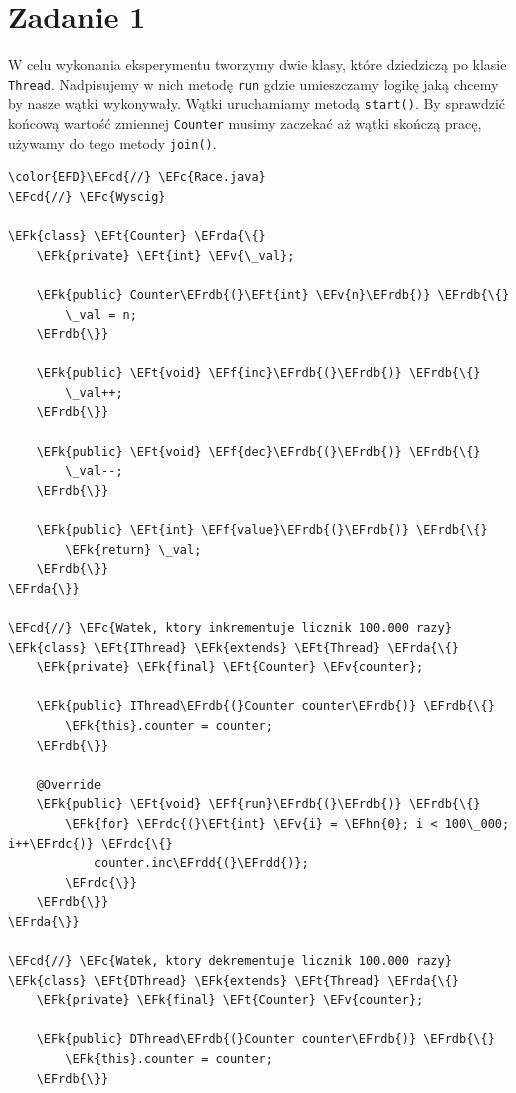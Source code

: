 \documentclass[11pt]{article}
\newcommand{\EFc}[1]{\textcolor{EFc}{#1}} %
\newcommand{\EFcd}[1]{\textcolor{EFcd}{#1}} %
\newcommand{\EFk}[1]{\textbf{#1}} %
\newcommand{\EFf}[1]{\textbf{#1}} %
\newcommand{\EFv}[1]{#1} %
\newcommand{\EFt}[1]{\textbf{#1}} %
\newcommand{\EFhn}[1]{\textcolor{EFhn}{\textbf{#1}}} %
\newcommand{\EFrda}[1]{\textcolor{EFrda}{#1}} %
\newcommand{\EFrdb}[1]{\textcolor{EFrdb}{#1}} %
\newcommand{\EFrdc}[1]{\textcolor{EFrdc}{#1}} %
\newcommand{\EFrdd}[1]{\textcolor{EFrdd}{#1}} %
\begin{document}
\section*{Zadanie 1}
\label{sec:orgdeca7f2}
W celu wykonania eksperymentu tworzymy dwie klasy, które dziedziczą po klasie
\texttt{Thread}. Nadpisujemy w nich metodę \texttt{run} gdzie umieszczamy logikę jaką chcemy by nasze
wątki wykonywały. Wątki uruchamiamy metodą \texttt{start()}. By sprawdzić końcową wartość
zmiennej \texttt{Counter} musimy zaczekać aż wątki skończą pracę, używamy do tego
metody \texttt{join()}.


\begin{Code}
\begin{Verbatim}
\color{EFD}\EFcd{//} \EFc{Race.java}
\EFcd{//} \EFc{Wyscig}

\EFk{class} \EFt{Counter} \EFrda{\{}
    \EFk{private} \EFt{int} \EFv{\_val};

    \EFk{public} Counter\EFrdb{(}\EFt{int} \EFv{n}\EFrdb{)} \EFrdb{\{}
        \_val = n;
    \EFrdb{\}}

    \EFk{public} \EFt{void} \EFf{inc}\EFrdb{(}\EFrdb{)} \EFrdb{\{}
        \_val++;
    \EFrdb{\}}

    \EFk{public} \EFt{void} \EFf{dec}\EFrdb{(}\EFrdb{)} \EFrdb{\{}
        \_val--;
    \EFrdb{\}}

    \EFk{public} \EFt{int} \EFf{value}\EFrdb{(}\EFrdb{)} \EFrdb{\{}
        \EFk{return} \_val;
    \EFrdb{\}}
\EFrda{\}}

\EFcd{//} \EFc{Watek, ktory inkrementuje licznik 100.000 razy}
\EFk{class} \EFt{IThread} \EFk{extends} \EFt{Thread} \EFrda{\{}
    \EFk{private} \EFk{final} \EFt{Counter} \EFv{counter};

    \EFk{public} IThread\EFrdb{(}Counter counter\EFrdb{)} \EFrdb{\{}
        \EFk{this}.counter = counter;
    \EFrdb{\}}

    @Override
    \EFk{public} \EFt{void} \EFf{run}\EFrdb{(}\EFrdb{)} \EFrdb{\{}
        \EFk{for} \EFrdc{(}\EFt{int} \EFv{i} = \EFhn{0}; i < 100\_000; i++\EFrdc{)} \EFrdc{\{}
            counter.inc\EFrdd{(}\EFrdd{)};
        \EFrdc{\}}
    \EFrdb{\}}
\EFrda{\}}

\EFcd{//} \EFc{Watek, ktory dekrementuje licznik 100.000 razy}
\EFk{class} \EFt{DThread} \EFk{extends} \EFt{Thread} \EFrda{\{}
    \EFk{private} \EFk{final} \EFt{Counter} \EFv{counter};

    \EFk{public} DThread\EFrdb{(}Counter counter\EFrdb{)} \EFrdb{\{}
        \EFk{this}.counter = counter;
    \EFrdb{\}}


\end{Verbatim}
\end{Code}
\end{document}
